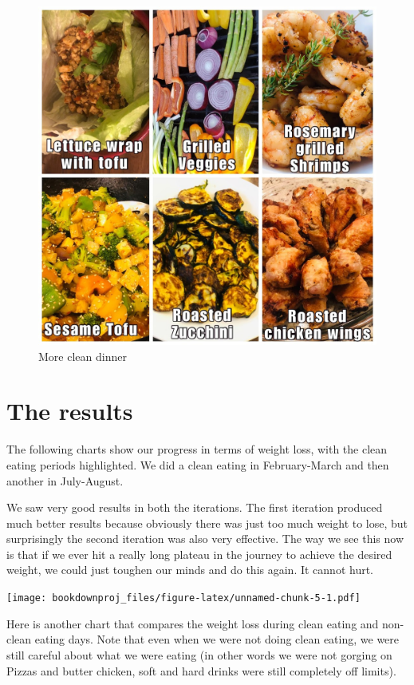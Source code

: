 \documentclass[
  oneside]{book}
\begin{document}
\begin{figure}
\centering
\includegraphics{pictures/dinner2.JPG}
\caption{More clean dinner}
\end{figure}

\pagebreak

\hypertarget{the-results}{%
\section{The results}\label{the-results}}

The following charts show our progress in terms of weight loss, with the clean eating periods highlighted. We did a clean eating in February-March and then another in July-August.

We saw very good results in both the iterations. The first iteration produced much better results because obviously there was just too much weight to lose, but surprisingly the second iteration was also very effective. The way we see this now is that if we ever hit a really long plateau in the journey to achieve the desired weight, we could just toughen our minds and do this again. It cannot hurt.

\texttt{[image: bookdownproj\_files/figure-latex/unnamed-chunk-5-1.pdf]}

Here is another chart that compares the weight loss during clean eating and non-clean eating days. Note that even when we were not doing clean eating, we were still careful about what we were eating (in other words we were not gorging on Pizzas and butter chicken, soft and hard drinks were still completely off limits).
\end{document}
